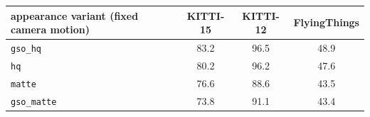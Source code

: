 \begin{tabular}{lccc}
\toprule
appearance variant (fixed camera motion) & KITTI-15 & KITTI-12 & FlyingThings \\
\midrule
\texttt{gso\_hq} & 83.2 & 96.5 & 48.9 \\
\texttt{hq} & 80.2 & 96.2 & 47.6 \\
\texttt{matte} & 76.6 & 88.6 & 43.5 \\
\texttt{gso\_matte} & 73.8 & 91.1 & 43.4 \\
\bottomrule
\end{tabular}
